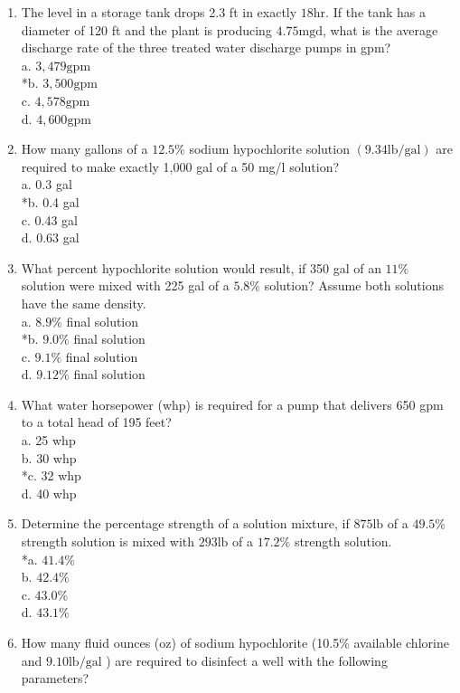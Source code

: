 \begin{enumerate}
  \item The level in a storage tank drops 2.3 ft in exactly $18 \mathrm{hr}$. If the tank has a diameter of 120 ft and the plant is producing $4.75 \mathrm{mgd}$, what is the average discharge rate of the three treated water discharge pumps in gpm?\\
a. $3,479 \mathrm{gpm}$\\
*b. $3,500 \mathrm{gpm}$\\
c. $4,578 \mathrm{gpm}$\\
d. $4,600 \mathrm{gpm}$\\
  \item How many gallons of a $12.5 \%$ sodium hypochlorite solution $(9.34 \mathrm{lb} / \mathrm{gal})$ are required to make exactly 1,000 gal of a 50 mg/l solution?\\
a. 0.3 gal\\
*b. 0.4 gal\\
c. 0.43 gal\\
d. 0.63 gal\\
  \item What percent hypochlorite solution would result, if 350 gal of an $11 \%$ solution were mixed with 225 gal of a $5.8 \%$ solution? Assume both solutions have the same density.\\
a. $8.9 \%$ final solution\\
*b. $9.0 \%$ final solution\\
c. $9.1 \%$ final solution\\
d. $9.12 \%$ final solution\\
  \item What water horsepower (whp) is required for a pump that delivers 650 gpm to a total head of 195 feet?\\
a. 25 whp\\
b. 30 whp\\
*c. 32 whp\\
d. 40 whp\\
  \item Determine the percentage strength of a solution mixture, if $875 \mathrm{lb}$ of a $49.5 \%$ strength solution is mixed with $293 \mathrm{lb}$ of a $17.2 \%$ strength solution.\\
*a. $41.4 \%$\\
b. $42.4 \%$\\
c. $43.0 \%$\\
d. $43.1 \%$ \\
\item How many fluid ounces (oz) of sodium hypochlorite (10.5\% available chlorine and $9.10 \mathrm{lb} / \mathrm{gal}$ ) are required to disinfect a well with the following parameters?\\

\end{enumerate}

